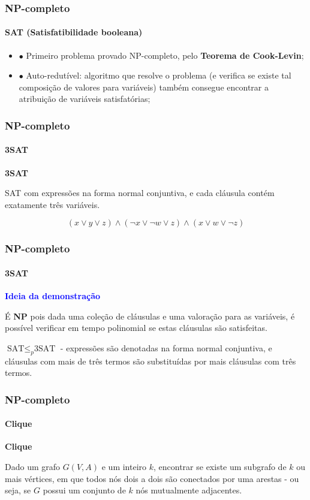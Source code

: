 \documentclass{beamer}
\begin{document}
\begin{frame}
\frametitle{NP-completo}
\framesubtitle{SAT (Satisfatibilidade booleana)}

\begin{itemize}
    \item $\bullet$ Primeiro problema provado NP-completo, pelo \textbf{Teorema de Cook-Levin};
    \item $\bullet$ Auto-redutível: algoritmo que resolve o problema (e verifica se existe tal composição de valores para variáveis) também consegue encontrar a atribuição de variáveis satisfatórias;
\end{itemize}
\end{frame}

\begin{frame}
\frametitle{NP-completo}
\framesubtitle{3SAT}

\textcolor{blue(pigment)}{\textbf{3SAT}}

SAT com expressões na forma normal conjuntiva, e cada cláusula contém exatamente três variáveis.

$$(x \lor y \lor z) \wedge (\neg x \lor \neg w \lor z) \wedge (x \lor w \lor \neg z)$$  

\end{frame}

\begin{frame}
\frametitle{NP-completo}
\framesubtitle{3SAT}

\textcolor{blue}{\textbf{Ideia da demonstração}}

É \textbf{NP} pois dada uma coleção de cláusulas e uma valoração para as variáveis, é possível verificar em tempo polinomial se estas cláusulas são satisfeitas.

\bigskip

$\text{SAT} \leq_p \text{3SAT}$ - expressões são denotadas na forma normal conjuntiva, e cláusulas com mais de três termos são substituídas por mais cláusulas com três termos.

\end{frame}

\begin{frame}
\frametitle{NP-completo}
\framesubtitle{Clique}
\textcolor{blue(pigment)}{\textbf{Clique}}

Dado um grafo $G(V, A)$ e um inteiro $k$, encontrar se existe um subgrafo de $k$ ou mais vértices, em que todos nós dois a dois são conectados por uma arestas - ou seja, se $G$ possui um conjunto de $k$ nós mutualmente adjacentes.

\end{frame}
\end{document}
